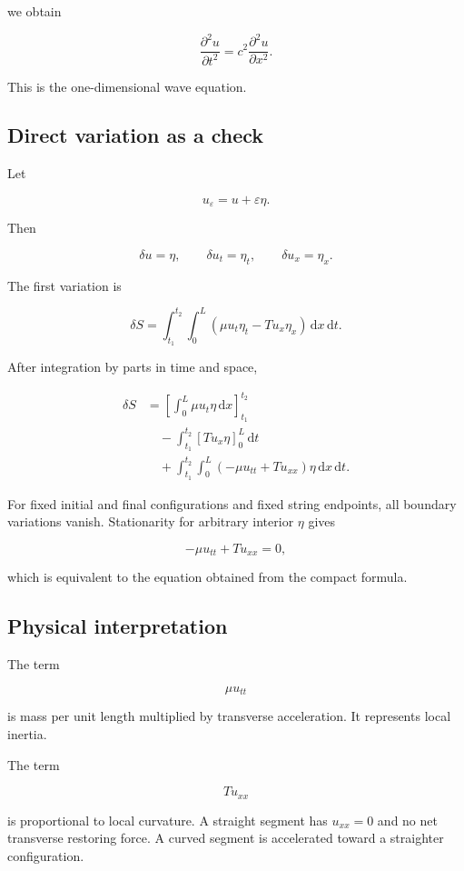 we obtain

\[
\boxed{
\frac{\partial^{2}u}{\partial t^{2}}
=
c^{2}
\frac{\partial^{2}u}{\partial x^{2}}
}.
\]

This is the one-dimensional wave equation.

\subsection{Direct variation as a check}

Let

\[
u_{\varepsilon}=u+\varepsilon\eta.
\]

Then

\[
\delta u=\eta,
\qquad
\delta u_{t}=\eta_{t},
\qquad
\delta u_{x}=\eta_{x}.
\]

The first variation is

\[
\delta S
=
\int_{t_{1}}^{t_{2}}
\int_{0}^{L}
\left(
\mu u_{t}\eta_{t}
-
T u_{x}\eta_{x}
\right)
\,\mathrm{d}x\,\mathrm{d}t.
\]

After integration by parts in time and space,

\[
\begin{aligned}
\delta S
&=
\left[
\int_{0}^{L}
\mu u_{t}\eta
\,\mathrm{d}x
\right]_{t_{1}}^{t_{2}}\\
&\quad-
\int_{t_{1}}^{t_{2}}
\left[
T u_{x}\eta
\right]_{0}^{L}
\,\mathrm{d}t\\
&\quad+
\int_{t_{1}}^{t_{2}}
\int_{0}^{L}
(-\mu u_{tt}+Tu_{xx})
\eta
\,\mathrm{d}x\,\mathrm{d}t.
\end{aligned}
\]

For fixed initial and final configurations and fixed string endpoints, all boundary variations vanish. Stationarity for arbitrary interior \(\eta\) gives

\[
-\mu u_{tt}+Tu_{xx}=0,
\]

which is equivalent to the equation obtained from the compact formula.

\subsection{Physical interpretation}

The term

\[
\mu u_{tt}
\]

is mass per unit length multiplied by transverse acceleration. It represents local inertia.

The term

\[
T u_{xx}
\]

is proportional to local curvature. A straight segment has \(u_{xx}=0\) and no net transverse restoring force. A curved segment is accelerated toward a straighter configuration.

